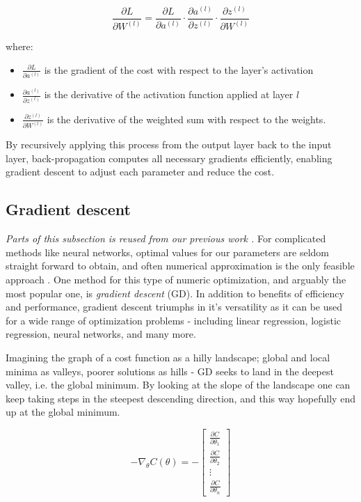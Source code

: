 \begin{equation}
\frac{\partial L}{\partial W^{(l)}} = \frac{\partial L}{\partial a^{(l)}} \cdot \frac{\partial a^{(l)}}{\partial z^{(l)}} \cdot \frac{\partial z^{(l)}}{\partial W^{(l)}}
\end{equation}

where:
\begin{itemize}[label=--]
    \item $\frac{\partial L}{\partial a^{(l)}}$ is the gradient of the cost with respect to the layer’s activation
    \item $\frac{\partial a^{(l)}}{\partial z^{(l)}}$ is the derivative of the activation function applied at layer $l$
    \item $\frac{\partial z^{(l)}}{\partial W^{(l)}}$ is the derivative of the weighted sum with respect to the weights.
\end{itemize}

By recursively applying this process from the output layer back to the input layer, back-propagation computes all necessary gradients efficiently, enabling gradient descent to adjust each parameter and reduce the cost.

\subsection{Gradient descent }\label{sec:gd}
\textit{Parts of this subsection is reused from our previous work \citep[p. 4]{project2}.}
For complicated methods like neural networks, optimal values for our parameters are seldom straight forward to obtain, and often numerical approximation is the only feasible approach \citep[Week 40]{morten}.  
One method for this type of numeric optimization, and arguably the most popular one, is \textit{gradient descent} (GD). In addition to benefits of efficiency and performance, gradient descent triumphs in it's versatility as it can be used for a wide range of optimization problems - including linear regression, logistic regression, neural networks, and many more. 

Imagining the graph of a cost function as a hilly landscape; global and local minima as valleys, poorer solutions as hills - GD seeks to land in the deepest valley, i.e. the global minimum. 
By looking at the slope of the landscape one can keep taking steps in the steepest descending direction, and this way hopefully end up at the global minimum.

\begin{equation}\label{eq:gd}
    -\nabla_\theta C(\theta) = -\begin{bmatrix}
\frac{\partial C}{\partial \theta_1} \\
\frac{\partial C}{\partial \theta_2} \\
\vdots \\
\frac{\partial C}{\partial \theta_n}
\end{bmatrix}
\end{equation}

